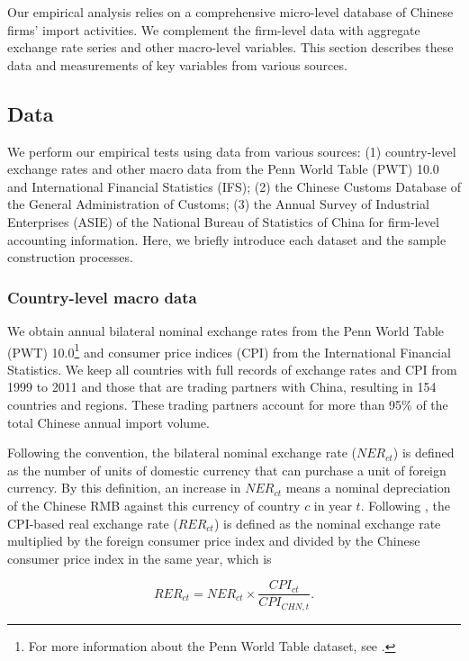 Our empirical analysis relies on a comprehensive micro-level database of Chinese firms' import activities. We complement the firm-level data with aggregate exchange rate series and other macro-level variables. This section describes these data and measurements of key variables from various sources. 

\subsection{Data} \label{Data}

We perform our empirical tests using data from various sources: (1) country-level exchange rates and other macro data from the Penn World Table (PWT) 10.0 and International Financial Statistics (IFS); (2) the Chinese Customs Database of the General Administration of Customs; (3) the Annual Survey of Industrial Enterprises (ASIE) of the National Bureau of Statistics of China for firm-level accounting information. Here, we briefly introduce each dataset and the sample construction processes.

\subsubsection{Country-level macro data} \label{Data-Macro}

We obtain annual bilateral nominal exchange rates from the Penn World Table (PWT) 10.0\footnote{For more information about the Penn World Table dataset, see \cite{feenstra2015}.} and consumer price indices (CPI) from the International Financial Statistics. We keep all countries with full records of exchange rates and CPI from 1999 to 2011 and those that are trading partners with China, resulting in 154 countries and regions. These trading partners account for more than 95\% of the total Chinese annual import volume.

Following the convention, the bilateral nominal exchange rate ($NER_{ct}$) is defined as the number of units of domestic currency that can purchase a unit of foreign currency. By this definition, an increase in $NER_{ct}$ means a nominal depreciation of the Chinese RMB against this currency of country $c$ in year $t$. Following \cite{lmx2015}, the CPI-based real exchange rate ($RER_{ct}$) is defined as the nominal exchange rate multiplied by the foreign consumer price index and divided by the Chinese consumer price index in the same year, which is

$$
RER_{ct}=NER_{ct} \times \frac{CPI_{ct}}{CPI_{CHN,t}}.
$$

